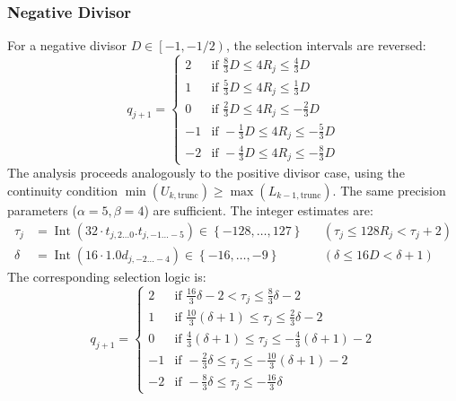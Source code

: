 \documentclass{article}
\DeclareMathOperator{\Int}{Int}
\begin{document}
\subsubsection{Negative Divisor}
\label{sssec:division:radix4_neg}
For a negative divisor $D \in \left[-1, -1/2\right)$, the selection intervals are reversed:
\begin{equation}
  \label{eq:division:radix4_intervals_neg}
  q_{j+1} =
  \begin{cases}
    2  & \text{if } \frac{8}{3} D \leq 4 R_j \leq \frac{4}{3} D \\
    1  & \text{if } \frac{5}{3} D \leq 4 R_j \leq \frac{1}{3} D \\
    0  & \text{if } \frac{2}{3} D \leq 4 R_j \leq -\frac{2}{3} D \\
    -1 & \text{if } -\frac{1}{3} D \leq 4 R_j \leq -\frac{5}{3} D \\
    -2 & \text{if } -\frac{4}{3} D \leq 4 R_j \leq -\frac{8}{3} D
  \end{cases}
\end{equation}
The analysis proceeds analogously to the positive divisor case, using the continuity condition $\min(U_{k,\mathrm{trunc}}) \geq \max(L_{k-1,\mathrm{trunc}})$.
The same precision parameters ($\alpha = 5, \beta = 4$) are sufficient.
The integer estimates are:
\begin{align}
  \label{eq:division:radix4_tau_val_neg}
  \tau_j &= \Int(32 \cdot t_{j,2\ldots0}.t_{j,-1\ldots-5}) \in \left\{-128, \dots, 127\right\} && (\tau_j \leq 128 R_j < \tau_j + 2) \\
  \label{eq:division:radix4_delta_val_neg}
  \delta &= \Int(16 \cdot 1.0d_{j,-2\ldots-4}) \in \left\{-16, \dots, -9\right\} && (\delta \leq 16 D < \delta + 1)
\end{align}
The corresponding selection logic is:
\begin{equation}
  \label{eq:division:radix4_logic_neg}
  q_{j+1} =
  \begin{cases}
    2  & \text{if } \frac{16}{3} \delta - 2 < \tau_j \leq \frac{8}{3} \delta - 2 \\
    1  & \text{if } \frac{10}{3} (\delta + 1) \leq \tau_j \leq \frac{2}{3} \delta - 2 \\
    0  & \text{if } \frac{4}{3} (\delta + 1) \leq \tau_j \leq -\frac{4}{3} (\delta + 1) - 2 \\
    -1 & \text{if } -\frac{2}{3} \delta \leq \tau_j \leq -\frac{10}{3} (\delta + 1) - 2 \\
    -2 & \text{if } -\frac{8}{3} \delta \leq \tau_j \leq -\frac{16}{3} \delta
  \end{cases}
\end{equation}
\end{document}
